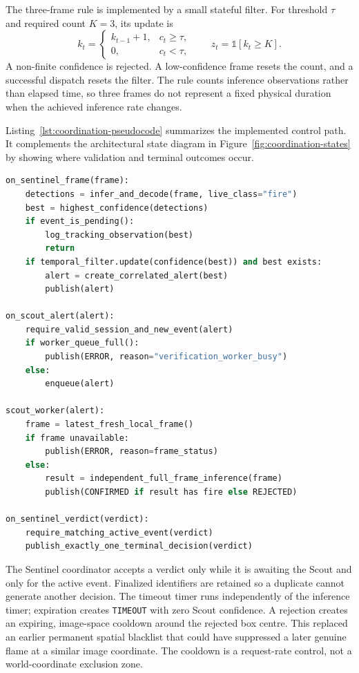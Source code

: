 The three-frame rule is implemented by a small stateful filter. For threshold
$\tau$ and required count $K=3$, its update is
\begin{equation}
  k_t = \begin{cases}
    k_{t-1}+1, & c_t \geq \tau,\\
    0, & c_t < \tau,
  \end{cases}
  \qquad z_t=\mathbb{1}[k_t\geq K].
  \label{eq:implementation-temporal-filter}
\end{equation}
A non-finite confidence is rejected. A low-confidence frame resets the count,
and a successful dispatch resets the filter. The rule counts inference
observations rather than elapsed time, so three frames do not represent a fixed
physical duration when the achieved inference rate changes.

Listing~\ref{lst:coordination-pseudocode} summarizes the implemented control
path. It complements the architectural state diagram in
Figure~\ref{fig:coordination-states} by showing where validation and terminal
outcomes occur.

\begin{lstlisting}[language=Python,caption={Simplified implemented detection--verification control path.},label={lst:coordination-pseudocode}]
on_sentinel_frame(frame):
    detections = infer_and_decode(frame, live_class="fire")
    best = highest_confidence(detections)
    if event_is_pending():
        log_tracking_observation(best)
        return
    if temporal_filter.update(confidence(best)) and best exists:
        alert = create_correlated_alert(best)
        publish(alert)

on_scout_alert(alert):
    require_valid_session_and_new_event(alert)
    if worker_queue_full():
        publish(ERROR, reason="verification_worker_busy")
    else:
        enqueue(alert)

scout_worker(alert):
    frame = latest_fresh_local_frame()
    if frame unavailable:
        publish(ERROR, reason=frame_status)
    else:
        result = independent_full_frame_inference(frame)
        publish(CONFIRMED if result has fire else REJECTED)

on_sentinel_verdict(verdict):
    require_matching_active_event(verdict)
    publish_exactly_one_terminal_decision(verdict)
\end{lstlisting}

The Sentinel coordinator accepts a verdict only while it is awaiting the Scout
and only for the active event. Finalized identifiers are retained so a duplicate
cannot generate another decision. The timeout timer runs independently of the
inference timer; expiration creates \texttt{TIMEOUT} with zero Scout confidence.
A rejection creates an expiring, image-space cooldown around the rejected box
centre. This replaced an earlier permanent spatial blacklist that could have
suppressed a later genuine flame at a similar image coordinate. The cooldown is
a request-rate control, not a world-coordinate exclusion zone.

